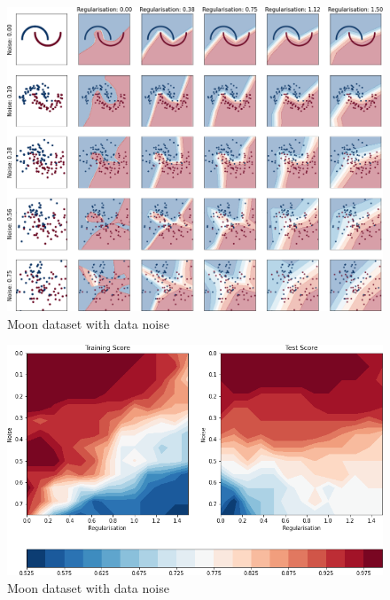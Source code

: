 \documentclass[9.5pt]{beamer}
\begin{document}
    \begin{frame}{}
        \begin{figure}
            \centering
            \includegraphics[height=0.9\textheight]{images/boundaries}
            \caption{Moon dataset with data noise}
        \end{figure}
    \end{frame}
    \begin{frame}{}
        \begin{figure}
            \centering
            \includegraphics[width=\linewidth]{images/moon_data}
            \caption{Moon dataset with data noise}
        \end{figure}
    \end{frame}
\end{document}
